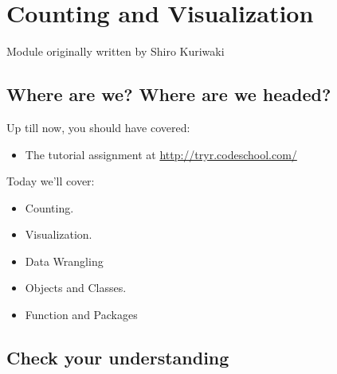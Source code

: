 \documentclass[]{book}
\providecommand{\tightlist}{%
  \setlength{\itemsep}{0pt}\setlength{\parskip}{0pt}}
\theoremstyle{definition}
\theoremstyle{definition}
\theoremstyle{definition}
\theoremstyle{remark}
\begin{document}

\chapter{Counting and Visualization}\label{counting-and-visualization}

Module originally written by Shiro Kuriwaki

\section{Where are we? Where are we
headed?}\label{where-are-we-where-are-we-headed}

Up till now, you should have covered:

\begin{itemize}
\tightlist
\item
  The tutorial assignment at \url{http://tryr.codeschool.com/}
\end{itemize}

Today we'll cover:

\begin{itemize}
\tightlist
\item
  Counting.
\item
  Visualization.
\item
  Data Wrangling
\item
  Objects and Classes.
\item
  Function and Packages
\end{itemize}

\section{Check your understanding}\label{check-your-understanding}
\end{document}
